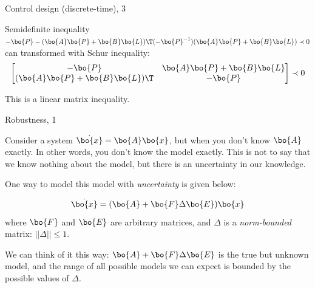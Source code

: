 \documentclass{beamer}
\begin{document}
\begin{frame}{Control design (discrete-time), 3}
	\begin{flushleft}
		
		Semidefinite inequality $-\bo{P} - (\bo{A}\bo{P} + \bo{B}\bo{L})\T (-\bo{P}^{-1}) (\bo{A}\bo{P} + \bo{B}\bo{L})  \prec 0$ can transformed with Schur inequality:
		\begin{align}
			\begin{bmatrix}
				-\bo{P} & \bo{A}\bo{P} + \bo{B}\bo{L} \\
				(\bo{A}\bo{P} + \bo{B}\bo{L})\T & -\bo{P}
			\end{bmatrix}  \prec 0
		\end{align}
		
		This is a linear matrix inequality.
		
	\end{flushleft}
\end{frame}




\begin{frame}{Robustness, 1}
	\begin{flushleft}
		
		Consider a system $\dot{\bo{x}} = \bo{A}\bo{x}$, but when you don't know $\bo{A}$ exactly. In other words, you don't know the model exactly. This is not to say that we know nothing about the model, but there is an uncertainty in our knowledge.
		
		\bigskip
		
		One way to model this model with \emph{uncertainty} is given below:
		
		\begin{equation}
			\label{eq:uncertain}
			\dot{\bo{x}} = (\bo{A} + \bo{F} \Delta \bo{E})\bo{x}
		\end{equation}
		where $\bo{F}$ and $\bo{E}$ are arbitrary matrices, and $\Delta$ is a \emph{norm-bounded} matrix: $||\Delta|| \leq 1$.
		
		\bigskip
		
		We can think of it this way: $\bo{A} + \bo{F} \Delta \bo{E}$ is the true but unknown model, and the range of all possible models we can expect is bounded by the possible values of $\Delta$.
		
	\end{flushleft}
\end{frame}
\end{document}
